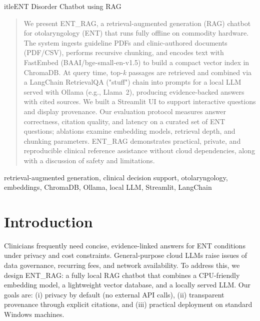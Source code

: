 \documentclass[conference]{IEEEtran}
\begin{document}
	itle{ENT Disorder Chatbot using RAG}

\author{
}

\maketitle

\begin{abstract}
We present ENT\_RAG, a retrieval-augmented generation (RAG) chatbot for otolaryngology (ENT) that runs fully offline on commodity hardware. The system ingests guideline PDFs and clinic-authored documents (PDF/CSV), performs recursive chunking, and encodes text with FastEmbed (BAAI/bge-small-en-v1.5) to build a compact vector index in ChromaDB. At query time, top-\emph{k} passages are retrieved and combined via a LangChain RetrievalQA ("stuff") chain into prompts for a local LLM served with Ollama (e.g., Llama~2), producing evidence-backed answers with cited sources. We built a Streamlit UI to support interactive questions and display provenance. Our evaluation protocol measures answer correctness, citation quality, and latency on a curated set of ENT questions; ablations examine embedding models, retrieval depth, and chunking parameters. ENT\_RAG demonstrates practical, private, and reproducible clinical reference assistance without cloud dependencies, along with a discussion of safety and limitations.
\end{abstract}

\begin{IEEEkeywords}
retrieval-augmented generation, clinical decision support, otolaryngology, embeddings, ChromaDB, Ollama, local LLM, Streamlit, LangChain
\end{IEEEkeywords}

\section{Introduction}
Clinicians frequently need concise, evidence-linked answers for ENT conditions under privacy and cost constraints. General-purpose cloud LLMs raise issues of data governance, recurring fees, and network availability. To address this, we design ENT\_RAG: a fully local RAG chatbot that combines a CPU-friendly embedding model, a lightweight vector database, and a locally served LLM. Our goals are: (i) privacy by default (no external API calls), (ii) transparent provenance through explicit citations, and (iii) practical deployment on standard Windows machines.
\end{document}
